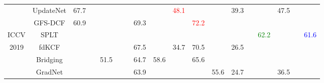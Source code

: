 \documentclass[10pt,twocolumn,letterpaper]{article}
\begin{document}
\begin{table*}[t]
\begin{tabular}{cccccccccccccccccc}
\cmidrule{2-18} \cmidrule{3-18} \cmidrule{4-18} \cmidrule{5-18} \cmidrule{6-18} \cmidrule{7-18} \cmidrule{8-18} \cmidrule{9-18} \cmidrule{10-18} \cmidrule{11-18} \cmidrule{12-18} \cmidrule{13-18} \cmidrule{14-18} \cmidrule{15-18} \cmidrule{16-18} \cmidrule{17-18} \cmidrule{18-18} 
 & UpdateNet \cite{Zhang19ICCV} & 67.7 &  &  &  &  &  &  & \textcolor{red}{48.1} &  &  & 39.3 &  &  & 47.5 &  & \tabularnewline
\cmidrule{2-18} \cmidrule{3-18} \cmidrule{4-18} \cmidrule{5-18} \cmidrule{6-18} \cmidrule{7-18} \cmidrule{8-18} \cmidrule{9-18} \cmidrule{10-18} \cmidrule{11-18} \cmidrule{12-18} \cmidrule{13-18} \cmidrule{14-18} \cmidrule{15-18} \cmidrule{16-18} \cmidrule{17-18} \cmidrule{18-18} 
 & GFS-DCF \cite{Xu19ICCV} & 60.9 &  &  &  &  & 69.3 &  &  & \textcolor{red}{72.2} &  &  &  &  &  &  & \tabularnewline
\cmidrule{2-18} \cmidrule{3-18} \cmidrule{4-18} \cmidrule{5-18} \cmidrule{6-18} \cmidrule{7-18} \cmidrule{8-18} \cmidrule{9-18} \cmidrule{10-18} \cmidrule{11-18} \cmidrule{12-18} \cmidrule{13-18} \cmidrule{14-18} \cmidrule{15-18} \cmidrule{16-18} \cmidrule{17-18} \cmidrule{18-18} 
ICCV & SPLT \cite{Yan19ICCV} &  &  &  &  &  &  &  &  &  &  &  &  & \textcolor{green}{62.2} &  &  & \textcolor{blue}{61.6}\tabularnewline
\cmidrule{2-18} \cmidrule{3-18} \cmidrule{4-18} \cmidrule{5-18} \cmidrule{6-18} \cmidrule{7-18} \cmidrule{8-18} \cmidrule{9-18} \cmidrule{10-18} \cmidrule{11-18} \cmidrule{12-18} \cmidrule{13-18} \cmidrule{14-18} \cmidrule{15-18} \cmidrule{16-18} \cmidrule{17-18} \cmidrule{18-18} 
2019 & fdKCF \cite{Zheng19ICCV} &  &  &  &  &  & 67.5 &  & 34.7 & 70.5 &  & 26.5 &  &  &  &  & \tabularnewline
\cmidrule{2-18} \cmidrule{3-18} \cmidrule{4-18} \cmidrule{5-18} \cmidrule{6-18} \cmidrule{7-18} \cmidrule{8-18} \cmidrule{9-18} \cmidrule{10-18} \cmidrule{11-18} \cmidrule{12-18} \cmidrule{13-18} \cmidrule{14-18} \cmidrule{15-18} \cmidrule{16-18} \cmidrule{17-18} \cmidrule{18-18} 
 & Bridging \cite{Huang19ICCV} &  &  & 51.5 &  &  & 64.7 & 58.6 &  & 65.6 &  &  &  &  &  &  & \tabularnewline
\cmidrule{2-18} \cmidrule{3-18} \cmidrule{4-18} \cmidrule{5-18} \cmidrule{6-18} \cmidrule{7-18} \cmidrule{8-18} \cmidrule{9-18} \cmidrule{10-18} \cmidrule{11-18} \cmidrule{12-18} \cmidrule{13-18} \cmidrule{14-18} \cmidrule{15-18} \cmidrule{16-18} \cmidrule{17-18} \cmidrule{18-18} 
 & GradNet \cite{Li19ICCV} &  &  &  &  &  & 63.9 &  &  &  & 55.6 & 24.7 &  &  & 36.5 &  & \tabularnewline
\cmidrule{2-18} \cmidrule{3-18} \cmidrule{4-18} \cmidrule{5-18} \cmidrule{6-18} \cmidrule{7-18} \cmidrule{8-18} \cmidrule{9-18} \cmidrule{10-18} \cmidrule{11-18} \cmidrule{12-18} \cmidrule{13-18} \cmidrule{14-18} \cmidrule{15-18} \cmidrule{16-18} \cmidrule{17-18} \cmidrule{18-18} 

\end{tabular}
\end{table*}
\end{document}
